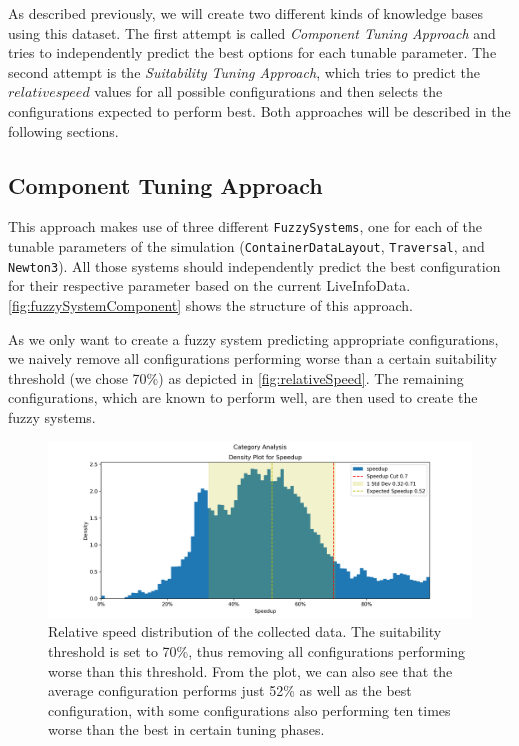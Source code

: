 As described previously, we will create two different kinds of knowledge bases using this dataset. The first attempt is called \emph{Component Tuning Approach} and tries to independently predict the best options for each tunable parameter. The second attempt is the \emph{Suitability Tuning Approach}, which tries to predict the $relative speed$ values for all possible configurations and then selects the configurations expected to perform best. Both approaches will be described in the following sections.

\subsection{Component Tuning Approach}

This approach makes use of three different \texttt{FuzzySystems}, one for each of the tunable parameters of the simulation (\texttt{ContainerDataLayout}, \texttt{Traversal}, and \texttt{Newton3}). All those systems should independently predict the best configuration for their respective parameter based on the current LiveInfoData. \autoref{fig:fuzzySystemComponent} shows the structure of this approach.

As we only want to create a fuzzy system predicting appropriate configurations, we naively remove all configurations performing worse than a certain suitability threshold (we chose 70\%) as depicted in \autoref{fig:relativeSpeed}. The remaining configurations, which are known to perform well, are then used to create the fuzzy systems.


\begin{figure}[H]
    \centering
    \includegraphics[width=\columnwidth,trim={1cm 0 2cm 1.5cm},clip]{figures/DataAnalytics/speedup.png}
    \caption[Relative speed distribution of the collected data]{Relative speed distribution of the collected data. The suitability threshold is set to 70\%, thus removing all configurations performing worse than this threshold. From the plot, we can also see that the average configuration performs just 52\% as well as the best configuration, with some configurations also performing ten times worse than the best in certain tuning phases.}
    \label{fig:relativeSpeed}
\end{figure}

